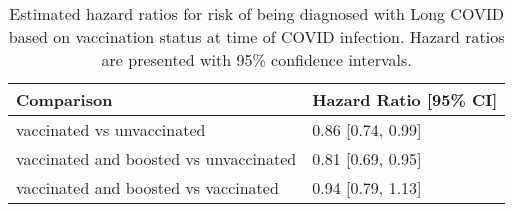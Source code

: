 \begin{table}[!htbp]
\centering
\begin{tabular}{ll}
  \hline
Comparison & Hazard Ratio [95\% CI] \\ 
  \hline
vaccinated vs unvaccinated & 0.86 [0.74, 0.99] \\ 
  vaccinated and boosted vs unvaccinated & 0.81 [0.69, 0.95] \\ 
  vaccinated and boosted vs vaccinated & 0.94 [0.79, 1.13] \\ 
   \hline
\end{tabular}
\caption{Estimated hazard ratios for risk of being diagnosed with Long COVID based on vaccination status at time of COVID infection. Hazard ratios are presented with 95\% confidence intervals.} 
\label{tab:cox_simple_alt_emm_pairs}
\end{table}
